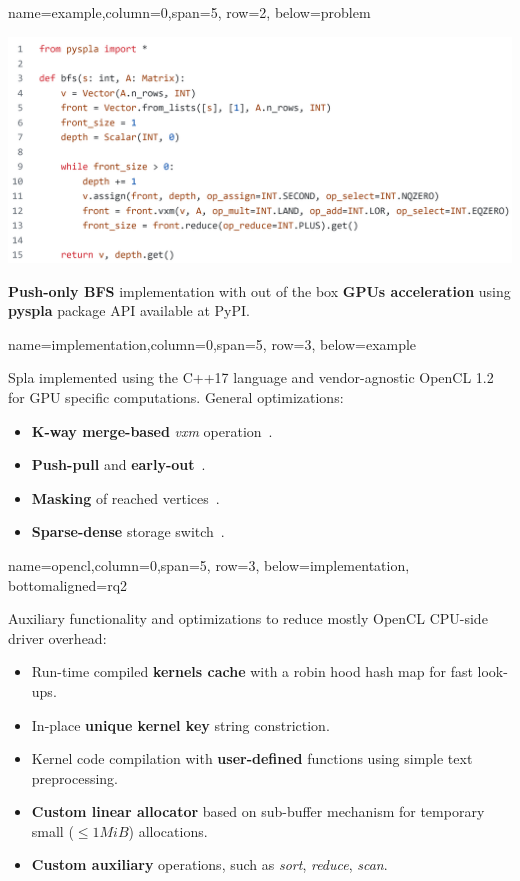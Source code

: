 \documentclass[a0paper,portrait]{baposter}
\begin{document}
\begin{poster}
{name=example,column=0,span=5, row=2, below=problem}
{
\begin{minipage}[b]{1.0\textwidth}
    \vspace{0pt}
    \includegraphics[width=\textwidth]{figures/spla_bfs.png}
\end{minipage}
\begin{minipage}[t]{1.0\textwidth}
    \textbf{Push-only BFS} implementation with out of the box \textbf{GPUs acceleration} using \textbf{pyspla} package API available at PyPI.
\end{minipage}
}

{name=implementation,column=0,span=5, row=3, below=example}
{
Spla implemented using the C++17 language and vendor-agnostic OpenCL 1.2 for GPU specific computations. General optimizations:

\begin{itemize}
    \item \textbf{K-way merge-based} \textit{vxm} operation~\cite{7284398:spvspm}.
    \item \textbf{Push-pull} and \textbf{early-out}~\cite{https://doi.org/10.48550/arxiv.1804.03327:pushpull}.
    \item \textbf{Masking} of reached vertices~\cite{yang2019graphblast}.
    \item \textbf{Sparse-dense} storage switch~\cite{yang2019graphblast}.
\end{itemize}
}

{name=opencl,column=0,span=5, row=3, below=implementation, bottomaligned=rq2}
{
Auxiliary functionality and optimizations to reduce mostly OpenCL CPU-side driver overhead:
\begin{itemize}
    \item Run-time compiled \textbf{kernels cache} with a robin hood hash map for fast look-ups.
    \item In-place \textbf{unique kernel key} string constriction. 
    \item Kernel code compilation with \textbf{user-defined} functions using simple text preprocessing.
    \item \textbf{Custom linear allocator} based on sub-buffer mechanism for temporary small ($\leq1\textit{MiB}$) allocations.
    \item \textbf{Custom auxiliary} operations, such as \textit{sort}, \textit{reduce}, \textit{scan}.
\end{itemize}
}


\end{poster}
\end{document}
